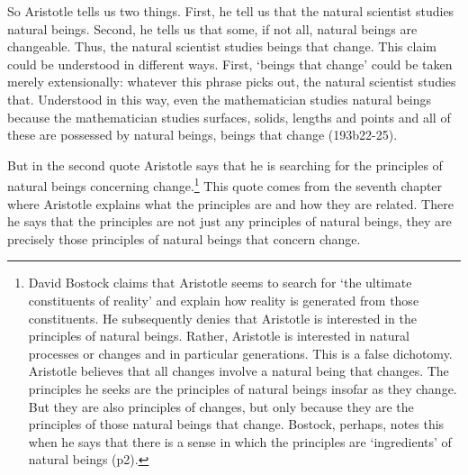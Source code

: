 \documentclass[10pt, oneside]{book}
\begin{document}
So Aristotle tells us two things. First, he tell us that the natural scientist studies natural beings. Second, he tells us that some, if not all, natural beings are changeable.  Thus, the natural scientist studies beings that change. This claim could be understood in different ways. First, `beings that change' could be taken merely extensionally: whatever this phrase picks out, the natural scientist studies that. Understood in this way, even the mathematician studies natural beings because the mathematician studies surfaces, solids, lengths and points and all of these are possessed by natural beings, beings that change (193b22-25). 

But in the second quote Aristotle says that he is searching for the principles of natural beings concerning change.\footnote{David Bostock \citep[p.~1]{BostockESSAYS} claims that Aristotle seems to search for `the ultimate constituents of reality' and explain how reality is generated from those constituents. He subsequently denies that Aristotle is interested in the principles of natural beings. Rather, Aristotle is interested in natural processes or changes and in particular generations. This is a false dichotomy. Aristotle believes that all changes involve a natural being that changes. The principles he seeks are the principles of natural beings insofar as they change. But they are also principles of changes, but only because they are the principles of those natural beings that change. Bostock, perhaps, notes this when he says that there is a sense in which the principles are `ingredients' of natural beings (p2).}  This quote comes from the seventh chapter where Aristotle explains what the principles are and how they are related. There he says that the principles are not just any principles of natural beings, they are precisely those principles of natural beings that concern change.

\end{document}
